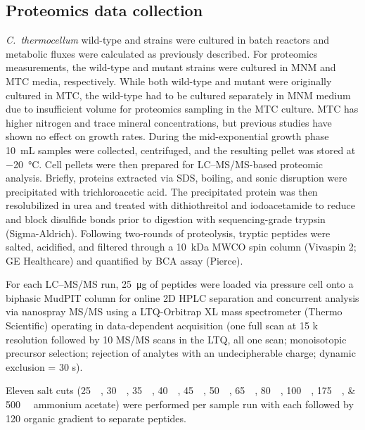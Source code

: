\subsection{Proteomics data collection}
\textit{C.~thermocellum} wild-type and  strains were cultured in batch reactors and metabolic fluxes were calculated as previously described. \citep{thompson2015}
For proteomics measurements, the wild-type and mutant strains were cultured in MNM and MTC media,\citep{kridelbaugh2013} respectively. While both wild-type and mutant were originally cultured in MTC,\citep{thompson2015} the wild-type had to be cultured separately in MNM medium due to insufficient volume for proteomics sampling in the MTC culture.
MTC has higher nitrogen and trace mineral concentrations, but previous studies have shown no effect on growth rates. \citep{kridelbaugh2013}
During the mid-exponential growth phase \SI{10}{\milli\liter} samples were collected, centrifuged, and the resulting pellet was stored at \SI{-20}{\celsius}. Cell pellets were then prepared for LC–MS/MS-based proteomic analysis.
Briefly, proteins extracted via SDS, boiling, and sonic disruption were precipitated with trichloroacetic acid. \citep{giannone2015}
The precipitated protein was then resolubilized in urea and treated with dithiothreitol and iodoacetamide to reduce and block disulfide bonds prior to digestion with sequencing-grade trypsin (Sigma-Aldrich).
Following two-rounds of proteolysis, tryptic peptides were salted, acidified, and filtered through a \SI{10}{\kilo\dalton} MWCO spin column (Vivaspin 2; GE Healthcare) and quantified by BCA assay (Pierce).

For each LC–MS/MS run, \SI{25}{\micro\gram} of peptides were loaded via pressure cell onto a biphasic MudPIT column for online 2D HPLC separation and concurrent analysis via nanospray MS/MS using a LTQ-Orbitrap XL mass spectrometer (Thermo Scientific) operating in data-dependent acquisition (one full scan at 15 k resolution followed by 10 MS/MS scans in the LTQ, all one \si{\micro}scan; monoisotopic precursor selection; rejection of analytes with an undecipherable charge; dynamic exclusion = 30 s).\citep{giannone2015a}

Eleven salt cuts (\SIlist{25;30;35;40;45;50;65;80;100;175;500}{\milli\molar} ammonium acetate) were performed per sample run with each followed by \SI{120}{\min} organic gradient to separate peptides.


